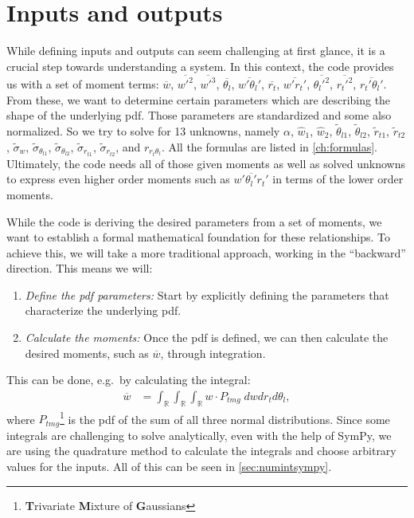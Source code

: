 \section{Inputs and outputs}\label{sec:inputsandoutputs}

While defining inputs and outputs can seem challenging at first glance,
it is a crucial step towards understanding a system.
In this context,
the code provides us with a set of moment terms:
$\overline{w}$, $\overline{w'^2}$, $\overline{w'^3}$, $\overline{\theta_l}$, $\overline{w'\theta_l'}$,
$\overline{r_t}$, $\overline{w' r_t'}$, $\overline{\theta_l'^2}$, $\overline{r_t'^2}$, $\overline{r_t'\theta_l'}$.
From these, we want to determine certain parameters which are describing the shape of the underlying \gls{pdf}.
Those parameters are standardized and some also normalized.
So we try to solve for 13 unknowns,
namely $\alpha$, $\widehat{w}_1$, $\widehat{w}_2$, $\tilde{\theta}_{l1}$, $\tilde{\theta}_{l2}$, $\tilde{r}_{t1}$,
$\tilde{r}_{t2}$, $\tilde{\sigma}_w$, $\tilde{\sigma}_{\theta_{l1}}$, $\tilde{\sigma}_{\theta_{l2}}$,
$\tilde{\sigma}_{r_{t1}}$, $\tilde{\sigma}_{r_{t2}}$, and $r_{r_t \theta_l}$.
All the formulas are listed in \cref{ch:formulas}.
Ultimately, the code needs all of those given moments as well as solved unknowns
to express even higher order moments such as $\overline{w'\theta_l'r_t'}$
in terms of the lower order moments.

While the code is deriving the desired parameters from a set of moments,
we want to establish a formal mathematical foundation for these relationships.
To achieve this, we will take a more traditional approach, working in the \enquote{backward} direction.
This means we will:
\begin{enumerate}
    \item \emph{Define the \gls{pdf} parameters:}
    Start by explicitly defining the parameters that characterize the underlying \gls{pdf}.
    \item \emph{Calculate the moments:}
    Once the \gls{pdf} is defined, we can then calculate the desired moments,
    such as $\overline{w}$, through integration.
\end{enumerate}
This can be done, e.g.\ by calculating the integral:
\begin{align}
    \overline{w}
    &= \int_{\mathbb{R}} \int_{\mathbb{R}} \int_{\mathbb{R}} w \cdot P_{tmg} \; dw dr_t d\theta_l,
\end{align}
where $P_{tmg}$\footnote{\textbf{T}rivariate \textbf{M}ixture of \textbf{G}aussians} is the \gls{pdf} of the sum of all three normal distributions.
Since some integrals are challenging to solve analytically,
even with the help of SymPy,
we are using the quadrature method to calculate the integrals
and choose arbitrary values for the inputs.
All of this can be seen in \cref{sec:numintsympy}.

